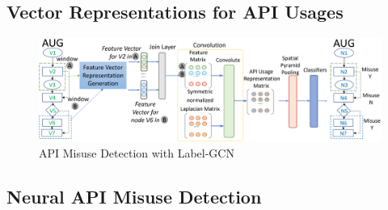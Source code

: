 \subsection{Vector Representations for API Usages}

\begin{figure}[t]
\begin{center}
\includegraphics[width=5.6in]{gcn-detection.png}
\vspace{-5pt}
\caption{API Misuse Detection with Label-GCN}
\label{fig:gcn-detection}
\end{center}
\end{figure}

\subsection{Neural API Misuse Detection}
